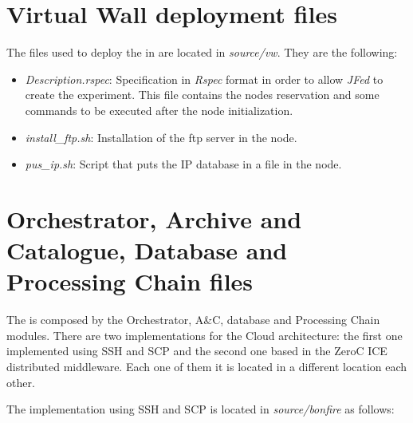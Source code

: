 \section{Virtual Wall deployment files}

The files used to deploy the \sss in \vw are
located in \emph{source/vw}. They are the following:
\begin{itemize}
\item \emph{Description.rspec}: Specification in \emph{Rspec} format in order to
  allow \emph{JFed} to create the experiment.  This file contains the nodes
  reservation and some commands to be executed after the node initialization.
\item \emph{install\_ftp.sh}: Installation of the ftp server in the node.
\item \emph{pus\_ip.sh}: Script that puts the IP database in a file in the node.
\end{itemize}

\section{Orchestrator, Archive and Catalogue, Database and Processing Chain
  files}

The \bonfire is composed by the Orchestrator, A\&C, database and Processing Chain
modules. 
There are two implementations for the Cloud architecture: the first one
implemented using \ac{SSH} and \ac{SCP} and the second one based in the ZeroC ICE
distributed middleware. Each one of them it is located in a different location each other.

The implementation using \ac{SSH} and \ac{SCP} is located in \emph{source/bonfire} as follows:

